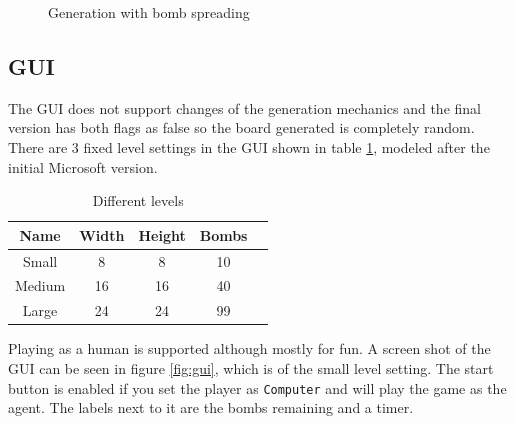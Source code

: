 \documentclass[11pt,a4paper,notitlepage]{article}
\theoremstyle{definition}
\begin{document}
\begin{figure}[H]
\begin{center}
\caption{Generation with bomb spreading}
\label{fig:recspl}
\end{center}
\end{figure}

\subsection{GUI}
The GUI does not support changes of the generation mechanics and the final version has both flags as false so the board generated is completely random. There are 3 fixed level settings in the GUI shown in table \ref{table:lvl}, modeled after the initial Microsoft version. 
\begin{table}[H]
\begin{center}
\begin{tabular}{ccccc}
Name & Width & Height & Bombs \\
\hline
Small & 8 & 8 & 10 \\
Medium & 16 & 16 & 40 \\
Large & 24 & 24 & 99
\end{tabular}
\caption{Different levels}
\label{table:lvl}
\end{center}
\end{table}

Playing as a human is supported although mostly for fun. A screen shot of the GUI can be seen in figure \ref{fig:gui}, which is of the small level setting. The start button is enabled if you set the player as \texttt{Computer} and will play the game as the agent. The labels next to it are the bombs remaining and a timer.
\end{document}
